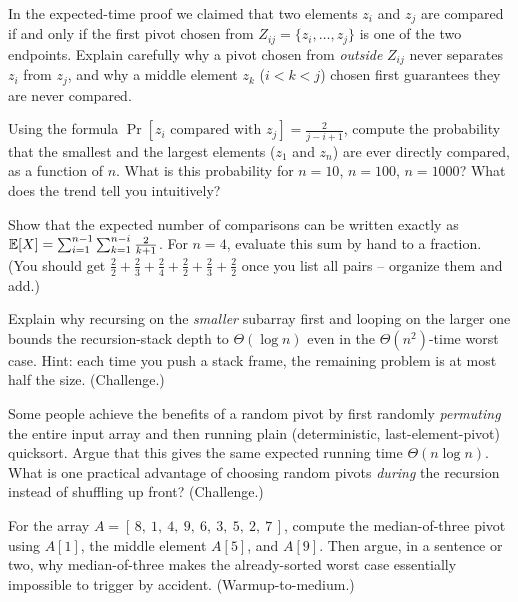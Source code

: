 \begin{exercise}
In the expected-time proof we claimed that two elements $z_i$ and $z_j$ are
compared if and only if the first pivot chosen from $Z_{ij} = \{z_i, \dots,
z_j\}$ is one of the two endpoints. Explain carefully why a pivot chosen from
\emph{outside} $Z_{ij}$ never separates $z_i$ from $z_j$, and why a middle
element $z_k$ ($i < k < j$) chosen first guarantees they are never compared.
\end{exercise}

\begin{exercise}
Using the formula $\Pr[z_i \text{ compared with } z_j] = \frac{2}{j-i+1}$,
compute the probability that the smallest and the largest elements ($z_1$ and
$z_n$) are ever directly compared, as a function of $n$. What is this probability
for $n = 10$, $n = 100$, $n = 1000$? What does the trend tell you intuitively?
\end{exercise}

\begin{exercise}
Show that the expected number of comparisons can be written exactly as
$\mathbb{E}[X] = \sum_{i=1}^{n-1}\sum_{k=1}^{n-i} \frac{2}{k+1}$. For $n = 4$, evaluate
this sum by hand to a fraction. (You should get $\frac{2}{2}+\frac{2}{3}+
\frac{2}{4}+\frac{2}{2}+\frac{2}{3}+\frac{2}{2}$ once you list all pairs --
organize them and add.)
\end{exercise}

\begin{exercise}
Explain why recursing on the \emph{smaller} subarray first and looping on the
larger one bounds the recursion-stack depth to $\Theta(\log n)$ even in the
$\Theta(n^2)$-time worst case. Hint: each time you push a stack frame, the
remaining problem is at most half the size. (Challenge.)
\end{exercise}

\begin{exercise}
Some people achieve the benefits of a random pivot by first randomly
\emph{permuting} the entire input array and then running plain (deterministic,
last-element-pivot) quicksort. Argue that this gives the same expected running
time $\Theta(n \log n)$. What is one practical advantage of choosing random
pivots \emph{during} the recursion instead of shuffling up front? (Challenge.)
\end{exercise}

\begin{exercise}
For the array $A = [\,8,\ 1,\ 4,\ 9,\ 6,\ 3,\ 5,\ 2,\ 7\,]$, compute the
median-of-three pivot using $A[1]$, the middle element $A[5]$, and $A[9]$. Then
argue, in a sentence or two, why median-of-three makes the already-sorted worst
case essentially impossible to trigger by accident. (Warmup-to-medium.)
\end{exercise}
